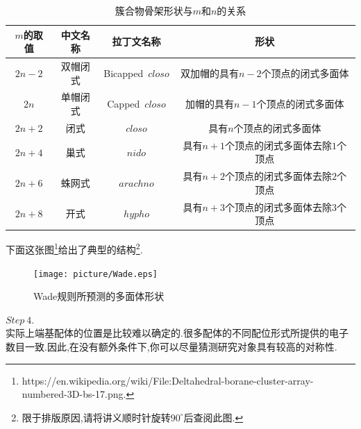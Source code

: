 \documentclass{ctexart}
\begin{document}
\begin{table}[H]
    \centering\begin{tabular}{|c|c|c|c|}
        \hline
        $m$的取值   &中文名称   &拉丁文名称 &形状\\\hline
        $2n-2$  &双帽闭式   &Bicapped\ $\mathit{closo}$ & 双加帽的具有$n-2$个顶点的闭式多面体 \\\hline
        $2n$  &单帽闭式   &Capped\ $\mathit{closo}$ & 加帽的具有$n-1$个顶点的闭式多面体 \\\hline
        $2n+2$  &闭式   &$\mathit{closo}$ & 具有$n$个顶点的闭式多面体 \\\hline
        $2n+4$  &巢式   &$\mathit{nido}$ & 具有$n+1$个顶点的闭式多面体去除$1$个顶点 \\\hline
        $2n+6$  &蛛网式   &$\mathit{arachno}$ & 具有$n+2$个顶点的闭式多面体去除$2$个顶点 \\\hline
        $2n+8$  &开式   &$\mathit{hypho}$ & 具有$n+3$个顶点的闭式多面体去除$3$个顶点 \\\hline
    \end{tabular}
    \caption{簇合物骨架形状与$m$和$n$的关系}
\end{table}
下面这张图\footnote{https://en.wikipedia.org/wiki/File:Deltahedral-borane-cluster-array-numbered-3D-bs-17.png.}给出了典型的结构\footnote{限于排版原因,请将讲义顺时针旋转$90^\circ$后查阅此图.}.
\begin{figure}[H]
    \centering\texttt{[image: picture/Wade.eps]}\caption{Wade规则所预测的多面体形状}
\end{figure}
\indent $\mathit{Step\ 4.}$\ \\
\indent 实际上端基配体的位置是比较难以确定的.很多配体的不同配位形式所提供的电子数目一致.因此,在没有额外条件下,你可以尽量猜测研究对象具有较高的对称性.
\end{document}
